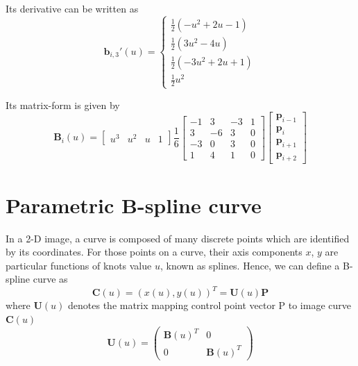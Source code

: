 Its derivative can be written as
\begin{equation}
  \label{eq:4.7}
  \mathbf{b}_{i,3}'(u) = \begin{cases} \frac{1}{2}(-u^2+2u-1) \\
    \frac{1}{2}(3u^2 -4u)\\ \frac{1}{2}(-3u^2+2u+1) \\
    \frac{1}{2}u^2
   \end{cases}
\end{equation}


Its matrix-form is given by
\begin{equation}
  \label{eq:4.8}
\mathbf{B}_i(u) = \begin{bmatrix} u^3 & u^2 & u & 1 \end{bmatrix} \frac{1}{6} \begin{bmatrix}
-1 &  3 & -3 & 1 \\
 3 & -6 &  3 & 0 \\
-3 &  0 &  3 & 0 \\
 1 &  4 &  1 & 0 \end{bmatrix}
\begin{bmatrix} \mathbf{p}_{i-1} \\ \mathbf{p}_{i} \\ \mathbf{p}_{i+1} \\ \mathbf{p}_{i+2} \end{bmatrix}
\end{equation}

\section{Parametric B-spline curve}
\label{sec:pbc}

In a 2-D image, a curve is composed of many discrete points which are
identified by its coordinates. For those points on a curve, their axis
components $x$, $y$ are particular functions of knots value $u$, known
as splines. Hence, we can define a B-spline curve as 
\begin{equation}
  \label{eq:4.11}
  \mathbf{C}(u) = (x(u),y(u))^T = \mathbf{U}(u) \mathbf{P}
\end{equation}
where $\mathbf{U}(u)$ denotes the matrix mapping control point vector P to image
curve $\mathbf{C}(u)$
\begin{equation}
  \label{eq:4.12}
  \mathbf{U}(u) =   \begin{pmatrix}
\mathbf{B}(u)^T & 0 \\
0 &\mathbf{B}(u)^T
  \end{pmatrix}
\end{equation}


